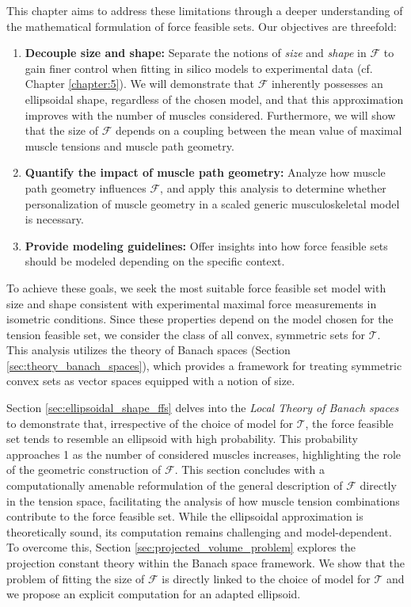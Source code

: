 This chapter aims to address these limitations through a deeper understanding of the mathematical formulation of force feasible sets. Our objectives are threefold:
\begin{enumerate}[noitemsep]
  \item \textbf{Decouple size and shape:}  Separate the notions of \emph{size} and \emph{shape} in $\mathcal{F}$ to gain finer control when fitting in silico models to experimental data (cf. Chapter \ref{chapter:5}). We will demonstrate that $\mathcal{F}$ inherently possesses an ellipsoidal shape, regardless of the chosen model, and that this approximation improves with the number of muscles considered.  Furthermore, we will show that the size of $\mathcal{F}$ depends on a coupling between the mean value of maximal muscle tensions and muscle path geometry.
  \item \textbf{Quantify the impact of muscle path geometry:} Analyze how muscle path geometry influences $\mathcal{F}$, and apply this analysis to determine whether personalization of muscle geometry in a scaled generic musculoskeletal model is necessary.
  \item \textbf{Provide modeling guidelines:} Offer insights into how force feasible sets should be modeled depending on the specific context.
\end{enumerate}

To achieve these goals, we seek the most suitable force feasible set model with size and shape consistent with experimental maximal force measurements in isometric conditions. Since these properties depend on the model chosen for the tension feasible set, we consider the class of all convex, symmetric sets for $\mathcal{T}$. This analysis utilizes the theory of Banach spaces (Section \ref{sec:theory_banach_spaces}), which provides a framework for treating symmetric convex sets as vector spaces equipped with a notion of size.

Section \ref{sec:ellipsoidal_shape_ffs} delves into the \emph{Local Theory of Banach spaces} to demonstrate that, irrespective of the choice of model for $\mathcal{T}$, the force feasible set tends to resemble an ellipsoid with high probability. This probability approaches 1 as the number of considered muscles increases, highlighting the role of the geometric construction of $\mathcal{F}$. This section concludes with a computationally amenable reformulation of the general description of $\mathcal{F}$ directly in the tension space, facilitating the analysis of how muscle tension combinations contribute to the force feasible set. While the ellipsoidal approximation is theoretically sound, its computation remains challenging and model-dependent. To overcome this, Section \ref{sec:projected_volume_problem} explores the projection constant theory within the Banach space framework. We show that the problem of fitting the size of $\mathcal{F}$ is directly linked to the choice of model for $\mathcal{T}$ and we propose an explicit computation for an adapted ellipsoid.

